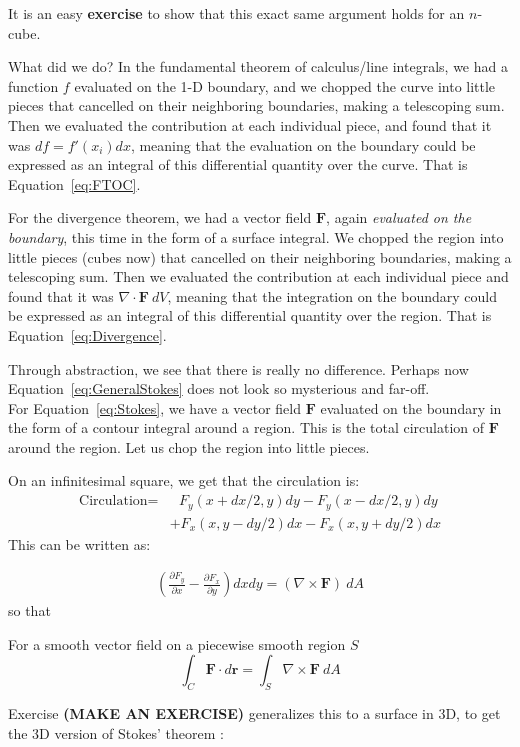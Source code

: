 \documentclass[../master.tex]{subfiles}
\begin{document}
	It is an easy \textbf{exercise} to show that this exact same argument holds for an $n$-cube. 
	
	What did we do? In the fundamental theorem of calculus/line integrals, we had a function $f$ evaluated on the 1-D boundary, and we chopped the curve into little pieces that cancelled on their neighboring boundaries, making a telescoping sum. Then we evaluated the contribution at each individual piece, and found that it was $df = f'(x_i) dx$, meaning that the evaluation on the boundary could be expressed as an integral of this differential quantity over the curve. That is Equation~\eqref{eq:FTOC}.
	
	For the divergence theorem, we had a vector field $\mathbf F$, again \emph{evaluated on the boundary}, this time in the form of a surface integral. We chopped the region into little pieces (cubes now) that cancelled on their neighboring boundaries, making a telescoping sum. Then we evaluated the contribution at each individual piece and found that it was $\nabla \cdot \mathbf F ~ dV$, meaning that the integration on the boundary could  be expressed as an integral of this differential quantity over the region. That is Equation~\eqref{eq:Divergence}.
	
	
	Through abstraction, we see that there is really no difference. Perhaps now Equation~\eqref{eq:GeneralStokes} does not look so mysterious and far-off.\\
	
	For Equation~\eqref{eq:Stokes}, we have a vector field $\mathbf F$ evaluated on the boundary in the form of a contour integral around a region. This is the total circulation of $\mathbf{F}$ around the region. Let us chop the region into little pieces. 
	
	
	On an infinitesimal square, we get that the circulation is:
	\begin{align*}
		\text{Circulation} =& ~~~  F_y (x+dx/2,y) dy - F_y (x-dx/2,y) dy \\ &+  F_x (x,y-dy/2) dx - F_x (x,y+dy/2) dx
	\end{align*}
	This can be written as:
	
	\begin{align*}
		\left( \frac{\partial F_y}{\partial x} - \frac{\partial F_x}{\partial y} \right) dx dy = (\nabla \times \mathbf F) ~ dA
	\end{align*}
	so that
	\begin{theorem} For a smooth vector field on a piecewise smooth region $S$ 
		\begin{equation}
			\int_C \mathbf{F} \cdot d\mathbf r = \int_S \nabla \times \mathbf{F} ~ dA
		\end{equation}
	\end{theorem}
	Exercise \textbf{(MAKE AN EXERCISE)} generalizes this to a surface in 3D, to get the 3D version of Stokes' theorem :
	
\end{document}
